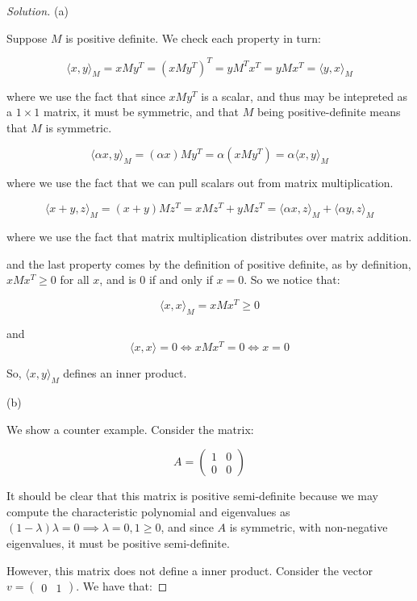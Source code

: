 \documentclass[10pt]{article}
\begin{document}
\begin{proof}[Solution]

(a)

Suppose $M$ is positive definite. We check each property in turn:

$$\langle x,y\rangle_M =  x M y^T = (x M y^T)^T = y M^T x^T = y M x^T = \langle y,x\rangle_M$$

where we use the fact that since $x M y^T$ is a scalar, and thus may be intepreted as a $1 \times 1$ matrix, it must be symmetric, and that $M$ being positive-definite means that $M$ is symmetric.

$$\langle \alpha x,y\rangle_M =  (\alpha x) M y^T = \alpha(x M y^T) = \alpha \langle x,y\rangle_M$$

where we use the fact that we can pull scalars out from matrix multiplication.

$$ \langle x+y, z \rangle_M  = (x+y) M z^T = xMz^T  + yMz^T = \langle \alpha x,z\rangle_M + \langle \alpha y,z\rangle_M $$

where we use the fact that matrix multiplication distributes over matrix addition.

and the last property comes by the definition of positive definite, as by definition, $x M x^T \geq 0$ for all $x$, and is 0 if and only if $x = 0$. So we notice that:

$$ \langle x, x \rangle_M = x M x^T \geq 0$$

and $$ \langle x,x \rangle = 0 \iff xM x^T = 0 \iff x = 0$$

So,  $\langle x,y\rangle_M$ defines an inner product.

(b)

We show a counter example. Consider the matrix:

$$A =   \begin{pmatrix} 1 & 0 \\ 0 & 0 \end{pmatrix}$$

It should be clear that this matrix is positive semi-definite because we may compute the characteristic polynomial and eigenvalues as $(1-\lambda) \lambda = 0 \implies \lambda = 0, 1 \geq 0$, and since $A$ is symmetric, with non-negative eigenvalues, it must be positive semi-definite.

However, this matrix does not define a inner product. Consider the vector $ v = \begin{pmatrix} 0 & 1 \end{pmatrix}$. We have that:


\end{proof}
\end{document}

